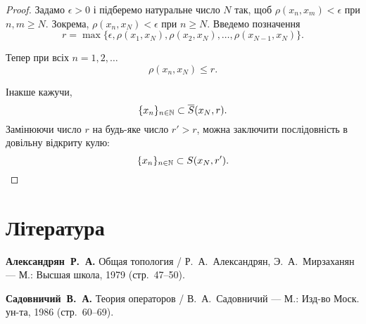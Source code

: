 \begin{proof}
Задамо $\epsilon > 0$ і підберемо натуральне число $N$
так, щоб $\rho(x_n, x_m) < \epsilon$ при $n, m \ge N$.
Зокрема, $\rho(x_n, x_N) < \epsilon$ при $n \ge N$.
Введемо позначення
\begin{equation*}
    r = \max \{ \epsilon, \rho(x_1, x_N), \rho(x_2, x_N), \dots, \rho(x_{N - 1}, x_N) \}.
\end{equation*}

Тепер при всіх $n = 1, 2, \dots$
\begin{equation*}
    \rho(x_n, x_N) \le r.
\end{equation*}

Інакше кажучи,
\begin{equation*}
    \{x_n\}_{n \in \mathbb{N}} \subset \overline{S}(x_N, r).
\end{equation*}
Замінюючи число $r$ на будь-яке число $r' > r$, можна
заключити послідовність в довільну відкриту кулю:
\begin{equation*}
    \{x_n\}_{n \in \mathbb{N}} \subset S(x_N, r'). \qedhere
\end{equation*}
\end{proof}

\section{Література}

\begin{enumerate}[label={[\arabic*]}]
\item \textbf{Александрян~Р.~А.}
Общая топология /
Р.~А.~Александрян, Э.~А.~Мирзаханян ---
М.: Высшая школа, 1979 (стр.~47--50).
\item \textbf{Садовничий~В.~А.}
Теория операторов /
В.~А.~Садовничий ---
М.: Изд-во Моск. ун-та, 1986 (стр.~60--69).
\end{enumerate}
